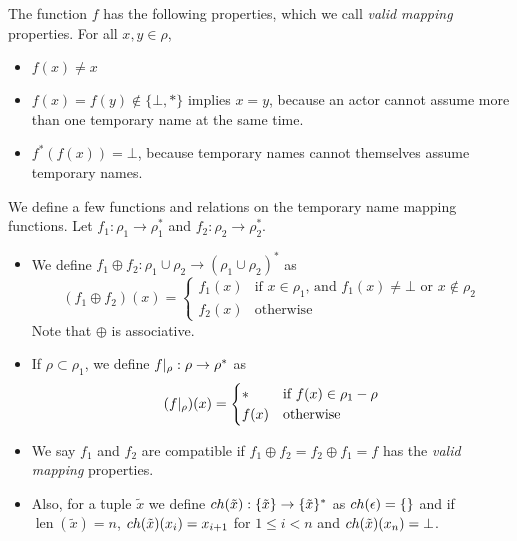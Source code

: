 The function $f$ has the following properties,
which we call \emph{valid mapping} properties. For all $x, y \in \rho$,
\begin{itemize}[noitemsep]
  \item $f(x) \neq x$
  \item $f(x) = f(y) \notin \{\bot, *\}$ implies $x = y$,
    because an actor cannot assume
    more than one temporary name at the same time.
  \item $f^*(f(x)) = \bot$,
    because temporary names cannot themselves assume temporary names.
\end{itemize}

We define a few functions and relations
on the temporary name mapping functions.
Let $f_1: \rho_1 \to \rho_1^*$ and  $f_2: \rho_2 \to \rho_2^*$.

\begin{itemize}
  \item
    We define $f_1 \oplus f_2: \rho_1 \cup \rho_2 \to (\rho_1 \cup \rho_2)^*$ as
    \begin{equation*}
      (f_1 \oplus f_2)(x) =
      \begin{cases}
        f_1(x) &\text{if $x \in \rho_1$, and $f_1(x) \neq \bot$ or $x \notin \rho_2$}\\
        f_2(x) &\text{otherwise}
      \end{cases}
    \end{equation*}
    Note that $\oplus$ is associative.
  \item
    If $\rho\subset\rho_1$, we define $f |_{\rho}: \rho\to\rho^*$ as
    \begin{equation*}
      (f |_{\rho})(x) =
      \begin{cases}
        *    &\text{if $f(x) \in \rho_1 - \rho$}\\
        f(x) &\text{otherwise}
      \end{cases}
    \end{equation*}
  \item
    We say $f_1$ and $f_2$ are compatible if
    $f_1 \oplus f_2 = f_2 \oplus f_1 = f$
    has the \emph{valid mapping} properties.
  \item
    Also, for a tuple $\tilde{x}$ we define
    $ch(\tilde{x}): \{\tilde{x}\} \to \{\tilde{x}\}^*$
    as
    $ch(\epsilon) = \{\}$
    and if $\operatorname{len}(\tilde{x}) = n$,
    $ch(\tilde{x})(x_i) = x_{i+1}$ for $1 \leq i < n$
    and
    $ch(\tilde{x})(x_n) = \bot$.
\end{itemize}

